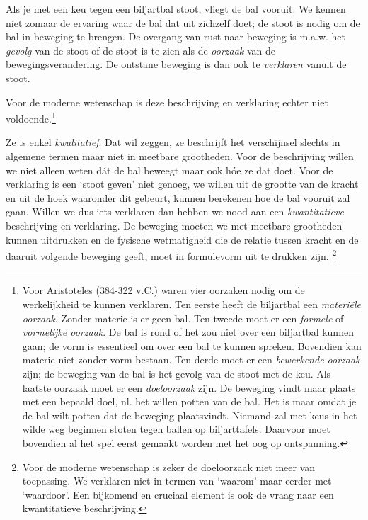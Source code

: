 \documentclass{ximera}
\begin{document}
	\author{Bart Lambregs}
    \xmsource\xmuitleg



Als je met een keu tegen een biljartbal stoot, vliegt de bal vooruit. 
We kennen niet zomaar de ervaring waar de bal dat uit zichzelf doet; de stoot is nodig om de bal in beweging te brengen. 
De overgang van rust naar beweging is m.a.w. het \textit{gevolg} van de stoot of de stoot is te zien als de \textit{oorzaak} van de bewegingsverandering. 
De ontstane beweging is dan ook te \textit{verklaren} vanuit de stoot.

Voor de moderne wetenschap is deze beschrijving en verklaring echter niet voldoende.\footnote{Voor Aristoteles (384-322 v.C.) waren vier oorzaken nodig om de werkelijkheid te kunnen verklaren. Ten eerste heeft de biljartbal een \textit{materiële oorzaak}. Zonder materie is er geen bal. Ten tweede moet er een \textit{formele} of \textit{vormelijke oorzaak}. De bal is rond of het zou niet over een biljartbal kunnen gaan; de vorm is essentieel om over een bal te kunnen spreken. Bovendien kan materie niet zonder vorm bestaan. Ten derde moet er een \textit{bewerkende oorzaak} zijn; de beweging van de bal is het gevolg van de stoot met de keu. Als laatste oorzaak moet er een \textit{doeloorzaak} zijn. De beweging vindt maar plaats met een bepaald doel, nl. het willen potten van de bal. Het is maar omdat je de bal wilt potten dat de beweging plaatsvindt. Niemand zal met keus in het wilde weg beginnen stoten tegen ballen op biljarttafels. Daarvoor moet bovendien al het spel eerst gemaakt worden met het oog op ontspanning.} 

Ze is enkel \textit{kwalitatief}. Dat wil zeggen, ze beschrijft het verschijnsel slechts in algemene termen maar niet in meetbare grootheden. 
Voor de beschrijving willen we niet alleen weten d\'at de bal beweegt maar ook h\'oe ze dat doet. 
Voor de verklaring is een `stoot geven' niet genoeg, we willen uit de grootte van de kracht en uit de hoek waaronder dit gebeurt, kunnen berekenen hoe de bal vooruit zal gaan. 
Willen we dus iets verklaren dan hebben we nood aan een \textit{kwantitatieve} beschrijving en verklaring. 
De beweging moeten we met meetbare grootheden kunnen uitdrukken en de fysische wetmatigheid die de relatie tussen kracht en de daaruit volgende beweging geeft, moet in formulevorm uit te drukken zijn.
\footnote{Voor de moderne wetenschap is zeker de doeloorzaak niet meer van toepassing. We verklaren niet in termen van `waarom' maar eerder met `waardoor'. Een bijkomend en cruciaal element is ook de vraag naar een kwantitatieve beschrijving.}
\end{document}
